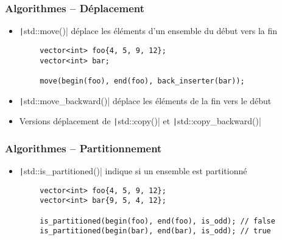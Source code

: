 \documentclass[C++.tex]{subfiles}
\begin{document}
\begin{frame}[fragile]
	\frametitle{Algorithmes -- Déplacement}
	\begin{itemize}
		\item \texttt|std::move()| déplace les éléments d'un ensemble du début vers la fin
	\end{itemize}

	\begin{verbatim}
		vector<int> foo{4, 5, 9, 12};
		vector<int> bar;

		move(begin(foo), end(foo), back_inserter(bar));
	\end{verbatim}

	\begin{itemize}
		\item \texttt|std::move_backward()| déplace les éléments de la fin vers le début
		\item Versions \og déplacement\fg{} de \texttt|std::copy()| et \texttt|std::copy_backward()|
	\end{itemize}
\end{frame}

\begin{frame}[fragile]
	\frametitle{Algorithmes -- Partitionnement}
	\begin{itemize}
		\item \texttt|std::is_partitioned()| indique si un ensemble est partitionné

	\end{itemize}

	\begin{verbatim}
		vector<int> foo{4, 5, 9, 12};
		vector<int> bar{9, 5, 4, 12};

		is_partitioned(begin(foo), end(foo), is_odd); // false
		is_partitioned(begin(bar), end(bar), is_odd); // true
	\end{verbatim}
\end{frame}
\end{document}

